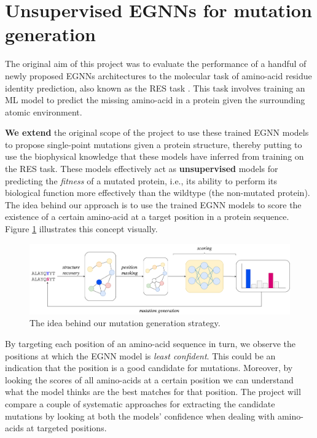 \section{Unsupervised EGNNs for mutation generation}

The original aim of this project was to evaluate the performance of a handful of newly proposed EGNNs architectures to the molecular task of amino-acid residue identity prediction, also known as the RES task \cite{atom-3d}. This task involves training an ML model to predict the missing amino-acid in a protein given the surrounding atomic environment. 

\textbf{We extend} the original scope of the project to use these trained EGNN models to propose single-point mutations given a protein structure, thereby putting to use the biophysical knowledge that these models have inferred from training on the RES task. These models effectively act as \textbf{unsupervised} models for predicting the \textit{fitness} of a mutated protein, i.e., its ability to perform its biological function more effectively than the wildtype (the non-mutated protein). The idea behind our approach is to use the trained EGNN models to score the existence of a certain amino-acid at a target position in a protein sequence. Figure \ref{idea} illustrates this concept visually. 

\begin{figure}[!h]
    \centering
    \includegraphics[width=\textwidth]{masters-report/figures/mutation_generation_2.png}
    \caption{The idea behind our mutation generation strategy.}
    \label{idea}
\end{figure}

By targeting each position of an amino-acid sequence in turn, we observe the positions at which the EGNN model is \textit{least confident}. This could be an indication that the position is a good candidate for mutations. Moreover, by looking the scores of all amino-acids at a certain position we can understand what the model thinks are the best matches for that position. The project will compare a couple of systematic approaches for extracting the candidate mutations by looking at both the models' confidence when dealing with amino-acids at targeted positions. 

